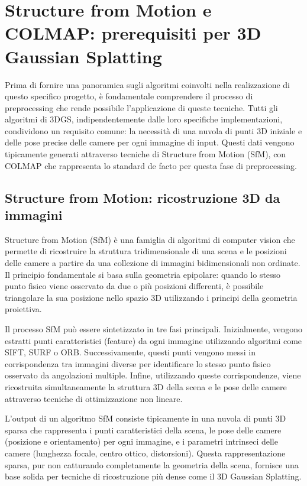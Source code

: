 \section{Structure from Motion e COLMAP: prerequisiti per 3D Gaussian Splatting}

Prima di fornire una panoramica sugli algoritmi coinvolti nella realizzazione di questo specifico progetto, è fondamentale comprendere il processo di preprocessing che rende possibile l'applicazione di queste tecniche. Tutti gli algoritmi di 3DGS, indipendentemente dalle loro specifiche implementazioni, condividono un requisito comune: la necessità di una nuvola di punti 3D iniziale e delle pose precise delle camere per ogni immagine di input. Questi dati vengono tipicamente generati attraverso tecniche di Structure from Motion (SfM), con COLMAP che rappresenta lo standard de facto per questa fase di preprocessing.

\subsection{Structure from Motion: ricostruzione 3D da immagini}

Structure from Motion (SfM) è una famiglia di algoritmi di computer vision che permette di ricostruire la struttura tridimensionale di una scena e le posizioni delle camere a partire da una collezione di immagini bidimensionali non ordinate. Il principio fondamentale si basa sulla geometria epipolare: quando lo stesso punto fisico viene osservato da due o più posizioni differenti, è possibile triangolare la sua posizione nello spazio 3D utilizzando i principi della geometria proiettiva.

Il processo SfM può essere sintetizzato in tre fasi principali. Inizialmente, vengono estratti punti caratteristici (feature) da ogni immagine utilizzando algoritmi come SIFT, SURF o ORB. Successivamente, questi punti vengono messi in corrispondenza tra immagini diverse per identificare lo stesso punto fisico osservato da angolazioni multiple. Infine, utilizzando queste corrispondenze, viene ricostruita simultaneamente la struttura 3D della scena e le pose delle camere attraverso tecniche di ottimizzazione non lineare.

\noindent L'output di un algoritmo SfM consiste tipicamente in una nuvola di punti 3D sparsa che rappresenta i punti caratteristici della scena, le pose delle camere (posizione e orientamento) per ogni immagine, e i parametri intrinseci delle camere (lunghezza focale, centro ottico, distorsioni). Questa rappresentazione sparsa, pur non catturando completamente la geometria della scena, fornisce una base solida per tecniche di ricostruzione più dense come il 3D Gaussian Splatting.

